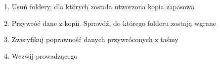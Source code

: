 \documentclass[polish]{article}
\begin{document}
\begin{enumerate}
\item Usuń foldery, dla których została utworzona kopia zapasowa

\item Przywróć dane z kopii. Sprawdź, do którego folderu zostają wgrane

\item Zweryfikuj poprawność danych przywróconych z taśmy

\item Wezwij prowadzącego

\end{enumerate}
\end{document}
